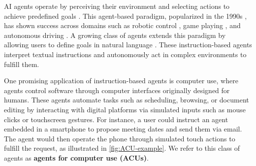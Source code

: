 \begin{figure}[t]
\label{fig:intro}
\end{figure}

AI agents operate by perceiving their environment and selecting actions to achieve predefined goals \citep{mnih_playing_2013}.
This agent-based paradigm, popularized in the 1990s \citep{schmidhuber1990line, 10.1145/122344.122377, russell_artificial_2022}, has shown success across domains such as robotic control \citep{yang_data_2020}, game playing \citep{baker_video_2022}, and autonomous driving \citep{grigorescu_survey_2020}.
A growing class of agents extends this paradigm by allowing users to define goals in natural language \citep{ouyang_training_2022}. These instruction-based agents interpret textual instructions and autonomously act in complex environments to fulfill them.

One promising application of instruction-based agents is computer use, where agents control software through computer interfaces originally designed for humans. These agents automate tasks such as scheduling, browsing, or document editing by interacting with digital platforms via simulated inputs such as mouse clicks or touchscreen gestures.
For instance, a user could instruct an agent embedded in a smartphone to propose meeting dates and send them via email. The agent would then operate the phone through simulated touch actions to fulfill the request, as illustrated in \cref{fig:ACU-example}.
We refer to this class of agents as \textbf{agents for computer use (ACUs)}.

